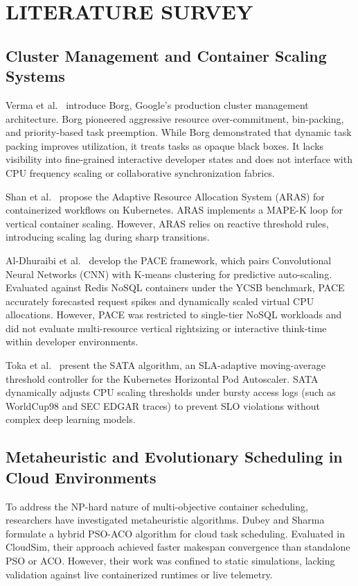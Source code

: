 \documentclass[12pt,a4paper]{report}
\begin{document}
	\chapter{LITERATURE SURVEY}
	
	
	
	\section{Cluster Management and Container Scaling Systems}
	Verma et al.~\cite{borg} introduce Borg, Google's production cluster management architecture. Borg pioneered aggressive resource over-commitment, bin-packing, and priority-based task preemption. While Borg demonstrated that dynamic task packing improves utilization, it treats tasks as opaque black boxes. It lacks visibility into fine-grained interactive developer states and does not interface with CPU frequency scaling or collaborative synchronization fabrics.
	
	Shan et al.~\cite{aras} propose the Adaptive Resource Allocation System (ARAS) for containerized workflows on Kubernetes. ARAS implements a MAPE-K loop for vertical container scaling. However, ARAS relies on reactive threshold rules, introducing scaling lag during sharp transitions.
	
	Al-Dhuraibi et al.~\cite{pace} develop the PACE framework, which pairs Convolutional Neural Networks (CNN) with K-means clustering for predictive auto-scaling. Evaluated against Redis NoSQL containers under the YCSB benchmark, PACE accurately forecasted request spikes and dynamically scaled virtual CPU allocations. However, PACE was restricted to single-tier NoSQL workloads and did not evaluate multi-resource vertical rightsizing or interactive think-time within developer environments.
	
	Toka et al.~\cite{sata} present the SATA algorithm, an SLA-adaptive moving-average threshold controller for the Kubernetes Horizontal Pod Autoscaler. SATA dynamically adjusts CPU scaling thresholds under bursty access logs (such as WorldCup98 and SEC EDGAR traces) to prevent SLO violations without complex deep learning models.
	
	\section{Metaheuristic and Evolutionary Scheduling in Cloud Environments}
	To address the NP-hard nature of multi-objective container scheduling, researchers have investigated metaheuristic algorithms. Dubey and Sharma~\cite{psoaco} formulate a hybrid PSO-ACO algorithm for cloud task scheduling. Evaluated in CloudSim, their approach achieved faster makespan convergence than standalone PSO or ACO. However, their work was confined to static simulations, lacking validation against live containerized runtimes or live telemetry.
	
\end{document}
